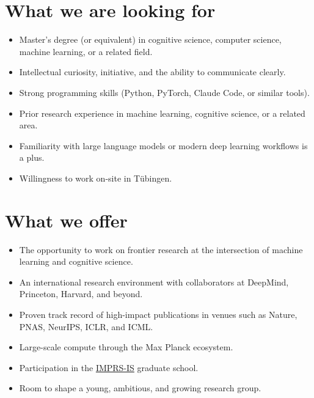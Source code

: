 \section*{What we are looking for}
\begin{itemize}
  \item Master's degree (or equivalent) in cognitive science, computer science, machine learning, or a related field.
  \item Intellectual curiosity, initiative, and the ability to communicate clearly.
  \item Strong programming skills (Python, PyTorch, Claude Code, or similar tools).
  \item Prior research experience in machine learning, cognitive science, or a related area.
  \item Familiarity with large language models or modern deep learning workflows is a plus.
  \item Willingness to work on-site in Tübingen.
\end{itemize}

\section*{What we offer}
\begin{itemize}
  \item The opportunity to work on frontier research at the intersection of machine learning and cognitive science.
  \item An international research environment with collaborators at DeepMind, Princeton, Harvard, and beyond.
  \item Proven track record of high-impact publications in venues such as Nature, PNAS, NeurIPS, ICLR, and ICML.
  \item Large-scale compute through the Max Planck ecosystem.
  \item Participation in the \href{https://imprs.is.mpg.de/}{IMPRS-IS} graduate school.
  \item Room to shape a young, ambitious, and growing research group.
\end{itemize}

